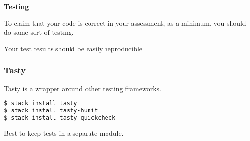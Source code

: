 \begin{frame}[fragile]

\vspace{\fill}

\begin{center}

{\Large \textbf{Testing}}

\begin{center}

To claim that your code is correct in your assessment, as a minimum, you should
do some sort of testing.

\bigskip

Your test results should be easily reproducible.

\end{center}

\end{center}

\vspace{\fill}

\end{frame}


\begin{frame}[fragile]

\frametitle{Tasty}

\vspace{\fill}

\begin{center}

Tasty is a wrapper around other testing frameworks.

\bigskip

\begin{lstlisting}[language=bash]
$ stack install tasty
$ stack install tasty-hunit
$ stack install tasty-quickcheck
\end{lstlisting}

\begin{center}

\pause

Best to keep tests in a separate module.

\end{center}



\end{center}

\vspace{\fill}

\end{frame}

